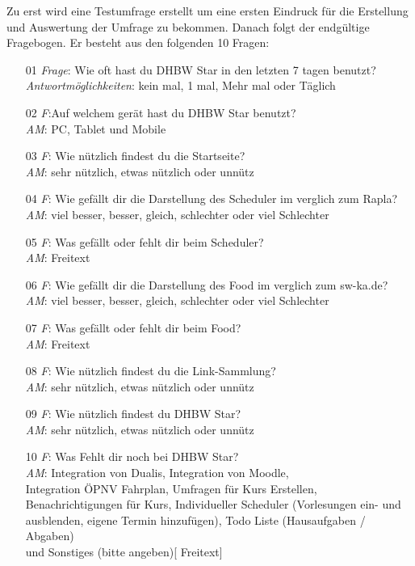 Zu erst wird eine Testumfrage erstellt um eine ersten Eindruck für die Erstellung und Auswertung der Umfrage zu bekommen.
Danach folgt der endgültige Fragebogen. Er besteht aus den folgenden 10 Fragen:
\begin{itemize}
	\item[01] {\emph{Frage}: Wie oft hast du DHBW Star in den letzten 7 tagen benutzt?\\
		\emph{Antwortmöglichkeiten}: kein mal, 1 mal, Mehr mal oder Täglich}
	\item[02]{\emph{F}:Auf welchem gerät hast du DHBW Star benutzt?\\
		\emph{AM}: PC, Tablet und Mobile}
	\item[03]{\emph{F}: Wie nützlich findest du die Startseite?\\
		\emph{AM}: sehr nützlich, etwas nützlich oder unnütz}
	\item[04]{\emph{F}: Wie gefällt dir die Darstellung des Scheduler im verglich zum Rapla?\\
		\emph{AM}: viel besser, besser, gleich, schlechter oder viel Schlechter}
	\item[05]{\emph{F}: Was gefällt oder fehlt dir beim Scheduler?\\
		\emph{AM}: Freitext}
	\item[06]{\emph{F}: Wie gefällt dir die Darstellung des Food im verglich zum sw-ka.de?\\
		\emph{AM}: viel besser, besser, gleich, schlechter oder viel Schlechter}
	\item[07]{\emph{F}: Was gefällt oder fehlt dir beim Food?\\
		\emph{AM}: Freitext}
	\item[08]{\emph{F}: Wie nützlich findest du die Link-Sammlung?\\
		\emph{AM}: sehr nützlich, etwas nützlich oder unnütz}
	\item[09]{\emph{F}: Wie nützlich findest du DHBW Star?\\
		\emph{AM}: sehr nützlich, etwas nützlich oder unnütz}
	\item[10]{\emph{F}: Was Fehlt dir noch bei DHBW Star?\\
		\emph{AM}: Integration von Dualis, Integration von Moodle,\\ Integration ÖPNV Fahrplan, Umfragen für Kurs Erstellen,\\ Benachrichtigungen für Kurs, Individueller Scheduler (Vorlesungen ein- und ausblenden, eigene Termin hinzufügen), Todo Liste (Hausaufgaben / Abgaben)\\ und Sonstiges (bitte angeben)[ Freitext]}
\end{itemize}
